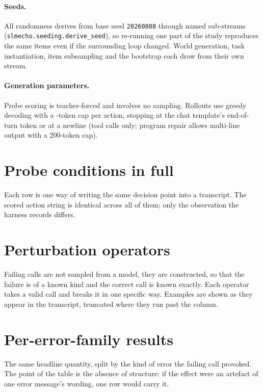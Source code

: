 \paragraph{Seeds.}
All randomness derives from base seed \texttt{20260808} through named
sub-streams (\texttt{slmecho.\allowbreak seeding.\allowbreak derive\_seed}), so
re-running one part of
the study reproduces the same items even if the surrounding loop changed. World
generation, task instantiation, item subsampling and the bootstrap each draw
from their own stream.

\paragraph{Generation parameters.}
Probe scoring is teacher-forced and involves no sampling. Rollouts use greedy
decoding with a \AgentTokenCap-token cap per action, stopping at the chat template's
end-of-turn token or at a newline (tool calls only; program repair allows
multi-line output with a 200-token cap).

\section{Probe conditions in full}
\label{app:conditions}

Each row is one way of writing the same decision point into a transcript. The
scored action string is identical across all of them; only the observation the
harness records differs.



\section{Perturbation operators}
\label{app:operators}

Failing calls are not sampled from a model, they are constructed, so that the
failure is of a known kind and the correct call is known exactly. Each operator
takes a valid call and breaks it in one specific way. Examples are shown as
they appear in the transcript, truncated where they run past the column.



\section{Per-error-family results}
\label{app:by-error}

The same headline quantity, split by the kind of error the failing call
provoked. The point of the table is the absence of structure: if the effect
were an artefact of one error message's wording, one row would carry it.

